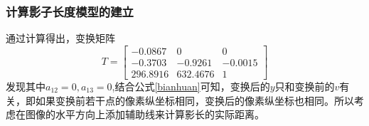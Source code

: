 \documentclass[12pt]{cumcmart}   %
\begin{document}
\begin{enumerate}
\end{enumerate}
\subsubsection{计算影子长度模型的建立}	
通过计算得出，变换矩阵
\begin{equation}
T = \left[ {\begin{array}{*{20}{c}}
	{ - 0.0867}&0&0\\
	{ - 0.3703}&{ - 0.9261}&{ - 0.0015}\\
	{296.8916}&{632.4676}&1
	\end{array}} \right]
\end{equation}
发现其中$a_{12}=0,a_{13}=0$,结合公式\ref{bianhuan}可知，变换后的$y$只和变换前的$v$有关，即如果变换前若干点的像素纵坐标相同，变换后的像素纵坐标也相同。所以考虑在图像的水平方向上添加辅助线来计算影长的实际距离。
\end{document}
